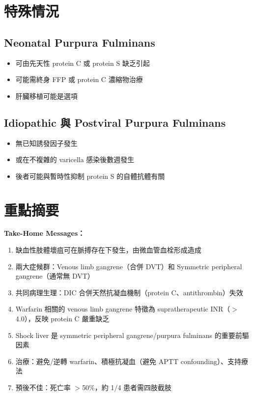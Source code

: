 \documentclass[12pt,a4paper]{article}
\begin{document}
\section{特殊情況}

\subsection{Neonatal Purpura Fulminans}

\begin{itemize}
    \item 可由先天性 protein C 或 protein S 缺乏引起
    \item 可能需終身 FFP 或 protein C 濃縮物治療
    \item 肝臟移植可能是選項
\end{itemize}

\subsection{Idiopathic 與 Postviral Purpura Fulminans}

\begin{itemize}
    \item 無已知誘發因子發生
    \item 或在不複雜的 varicella 感染後數週發生
    \item 後者可能與暫時性抑制 protein S 的自體抗體有關
\end{itemize}

\section{重點摘要}

\begin{importantbox}
\textbf{Take-Home Messages：}
\begin{enumerate}
    \item 缺血性肢體壞疽可在脈搏存在下發生，由微血管血栓形成造成
    \item 兩大症候群：Venous limb gangrene（合併 DVT）和 Symmetric peripheral gangrene（通常無 DVT）
    \item 共同病理生理：DIC 合併天然抗凝血機制（protein C、antithrombin）失效
    \item Warfarin 相關的 venous limb gangrene 特徵為 supratherapeutic INR（$>$4.0），反映 protein C 嚴重缺乏
    \item Shock liver 是 symmetric peripheral gangrene/purpura fulminans 的重要前驅因素
    \item 治療：避免/逆轉 warfarin、積極抗凝血（避免 APTT confounding）、支持療法
    \item 預後不佳：死亡率 $>$50\%，約 1/4 患者需四肢截肢
\end{enumerate}
\end{importantbox}
\end{document}
